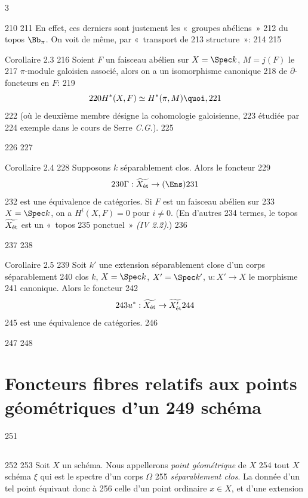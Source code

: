3	\documentclass[10pt]{../fichiers-configuration-latex/smfart}
\begin{document}
   210	
   211	En effet, ces derniers sont justement les « groupes abéliens »
   212	du topos $\Bb_{\pi}$. On voit de même, par « transport de
   213	structure »:
   214	
   215	\begin{enonce*}{Corollaire 2.3}
   216	Soient $F$ un faisceau abélien sur $X = \Spec k$, $M = j(F)$ le
   217	$\pi$-module galoisien associé, alors on a un isomorphisme canonique
   218	de $\partial$-foncteurs en $F$:
   219	$$
   220	H^{\ast} (X, F) \simeq H^{\ast} (\pi, M){\quoi},
   221	$$
   222	(où le deuxième membre désigne la cohomologie galoisienne,
   223	étudiée par
   224	exemple dans le cours de Serre \emph{C.G.}).
   225	\end{enonce*}
   226	
   227	\begin{enonce*}{Corollaire 2.4}
   228	Supposons $k$ séparablement clos. Alors le foncteur
   229	$$
   230	\Gamma : \widetilde{X_{\text{\rm ét}}} \to (\Ens)
   231	$$
   232	est une équivalence de catégories. Si $F$ est un faisceau abélien sur
   233	$X = \Spec k$, on a $H^{i}(X, F) = 0$ pour $i \neq 0$. (En d'autres
   234	termes, le topos $\widetilde{X_{\text{\rm ét}}}$ est un « topos
   235	ponctuel » \emph{(IV 2.2)}.)
   236	\end{enonce*}
   237	
   238	\begin{enonce*}{Corollaire 2.5}
   239	Soit $k'$ une extension séparablement close d'un corps séparablement
   240	clos $k$, $X = \Spec k$, $X' = \Spec k'$, $u : X'\to X$ le morphisme
   241	canonique. Alors le foncteur
   242	$$
   243	u^{\ast} : \widetilde{X_{\text{\rm ét}}} \to \widetilde{X'_{\text{\rm ét}}}
   244	$$
   245	est une équivalence de catégories.
   246	\end{enonce*}
   247	
   248	\section{Foncteurs fibres relatifs aux points géométriques d'un
   249	  schéma}	
   251	\subsection{}
   252	
   253	Soit $X$ un schéma. Nous appellerons \emph{point géométrique} de $X$
   254	tout $X$ schéma $\xi$ qui est le spectre d'un corps $\Omega$
   255	\emph{séparablement clos}. La donnée d'un tel point équivaut donc à
   256	celle d'un point ordinaire $x \in X$, et d'une extension
\end{document}

